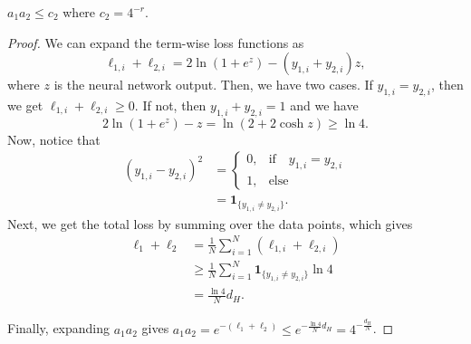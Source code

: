 \documentclass[10pt,a4paper]{amsart}
\begin{document}
\begin{lemma}
\label{lem:constraint}
$a_1a_2 \leq c_2$ where $c_2=4^{-r}$.
\end{lemma}

\begin{proof}
We can expand the term-wise loss functions as
\[
\ell_{1,i}+\ell_{2,i}= 2\ln (1+e^{z})-(y_{1,i}+y_{2,i})z,
\]
where $z$ is the neural network output. Then, we have two cases. If $y_{1,i}=y_{2,i}$, then we get $\ell_{1,i}+\ell_{2,i}\ge0$. If not, then $y_{1,i}+y_{2,i}=1$ and we have
\[
2\ln(1+e^{z})- z = \ln(2+2\cosh z ) \ge \ln 4.
\]
Now, notice that
\begin{align}
(y_{1,i}-y_{2,i})^2 &= 
\begin{cases}
    0, & \text{if}\quad y_{1,i}=y_{2,i} \\
    1,  & \text{else}\quad
\end{cases} \\
&= \mathbf{1}_{\{y_{1,i}\ne y_{2,i}\}}.
\end{align}
Next, we get the total loss by summing over the data points, which gives
\begin{align}
 \ell_1+\ell_2 &= \frac{1}{N}\sum_{i=1}^N \left( \ell_{1,i}+\ell_{2,i} \right)\\
&\geq \frac{1}{N}\sum_{i=1}^N \mathbf{1}_{\{y_{1,i}\ne y_{2,i}\}} \ln4\\
&=\frac{\ln4}{N}d_H.
\end{align}

Finally, expanding $a_1a_2$ gives $a_1a_2 = e^{-(\ell_1+\ell_2)} \le e^{-\frac{\ln4}{N}d_H}=4^{-\frac{d_H}{N}}$.
\end{proof}
\end{document}
